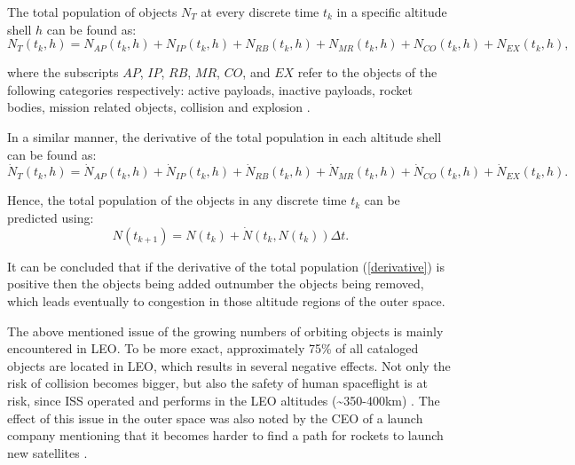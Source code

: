 The total population of objects $N_T$ at every discrete time $t_k$ in a specific altitude shell $h$ can be found as:
\begin{equation} \label{total_population}
N_T(t_k, h) = N_{AP}(t_k, h) + N_{IP}(t_k, h) + N_{RB}(t_k, h) + N_{MR}(t_k, h) + N_{CO}(t_k, h) + N_{EX}(t_k, h),
\end{equation}

where the subscripts $AP$, $IP$, $RB$, $MR$, $CO$, and $EX$ refer to the objects of the following categories respectively: active payloads, inactive payloads, rocket bodies, mission related objects, collision and explosion \cite{Somma 2019}.

\pagebreak
In a similar manner, the derivative of the total population in each altitude shell can be found as:
\begin{equation}\label{derivative}
\dot{N}_T(t_k, h) = \dot{N}_{AP}(t_k, h) + \dot{N}_{IP}(t_k, h) + \dot{N}_{RB}(t_k, h) + \dot{N}_{MR}(t_k, h) + \dot{N}_{CO}(t_k, h) + \dot{N}_{EX}(t_k, h).
\end{equation}

Hence, the total population of the objects in any discrete time $t_k$ can be predicted using:
\begin{equation}\label{future}
N(t_{k+1}) = N(t_k) + \dot{N}(t_k, N(t_k))\Delta t.
\end{equation}

It can be concluded that if the derivative of the total population (\ref{derivative}) is positive then the objects being added outnumber the objects being removed, which leads eventually to congestion in those altitude regions of the outer space.

\bigskip
The above mentioned issue of the growing numbers of orbiting objects is mainly encountered in LEO. To be more exact, approximately 75\% of all cataloged objects are located in LEO, which results in several negative effects. Not only the risk of collision becomes bigger, but also the safety of human spaceflight is at risk, since ISS operated and performs in the LEO altitudes (\textasciitilde 350-400km) \cite{Kramer 2002}. The effect of this issue in the outer space was also noted by the CEO of a launch company mentioning that it becomes harder to find a path for rockets to launch new satellites \cite{crowded}.


